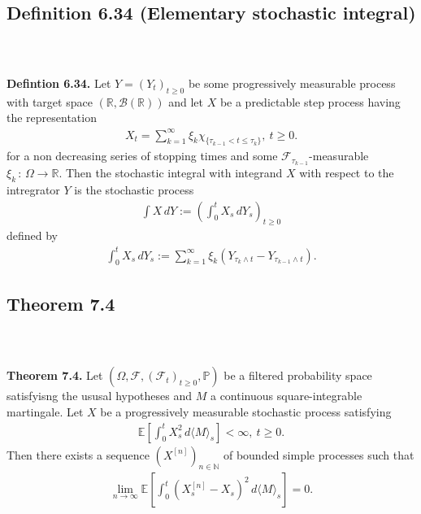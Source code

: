 \documentclass{beamer}
\numberwithin{equation}{section}
\newenvironment{frame2}{\begin{frame}\frametitle{{\normalsize \secname} \\ {\large \subsecname}}}{\end{frame}}
\begin{document}
\subsection{Definition 6.34 (Elementary stochastic integral)}

\begin{frame2}
    \begingroup
    \footnotesize
    \textbf{Defintion 6.34.}
    Let $Y = (Y_t)_{t\geq 0}$ be some progressively measurable process with target space $(\mathbb{R}, \mathcal{B}(\mathbb{R}))$ and let $X$ be a predictable step process having the representation
    \begin{align}
        X_t = \sum_{k = 1}^\infty \xi_k \chi_{\{\tau_{k - 1} < t \leq \tau_k\}}, \ t \geq 0.
    \end{align}
    for a non decreasing series of stopping times and some $\mathcal{F}_{\tau_{k-1}}$-measurable $\xi_k \, : \, \Omega \to \mathbb{R}$.
    Then the stochastic integral with integrand $X$ with respect to the intregrator $Y$ is the stochastic process
    \begin{align}
        \int X \, dY := \left(\int_0^t X_s \, d Y_s\right)_{t \geq 0}
    \end{align}
    defined by
    \begin{align}
        \int_0^t X_s \, dY_s := \sum_{k = 1}^\infty \xi_k \left(Y_{\tau_k \wedge t} - Y_{\tau_{k- 1} \wedge t}\right).
    \end{align}
    \endgroup
\end{frame2}


\subsection{Theorem 7.4}

\begin{frame2}
    \textbf{Theorem 7.4.}
    Let $(\Omega, \mathcal{F}, (\mathcal{F}_t)_{t \geq 0},\mathbb{P})$ be a filtered probability space satisfyisng the ususal hypotheses and $M$ a continuous square-integrable martingale.
    Let $X$ be a progressively measurable stochastic process satisfying
    \begin{align}
        \mathbb{E}\left[\int_0^t X_s^2 \, d \langle M \rangle_s \right] < \infty, \ t \geq 0.
    \end{align}
    Then there exists a sequence $(X^{[n]})_{n\in \mathbb{N}}$ of bounded simple processes such that
    \begin{align}
        \lim_{n \to \infty} \mathbb{E}\left[\int_0^t (X_s^{[n]} - X_s)^2 \, d\langle M \rangle_s\right] = 0.
    \end{align}
\end{frame2}
\end{document}
